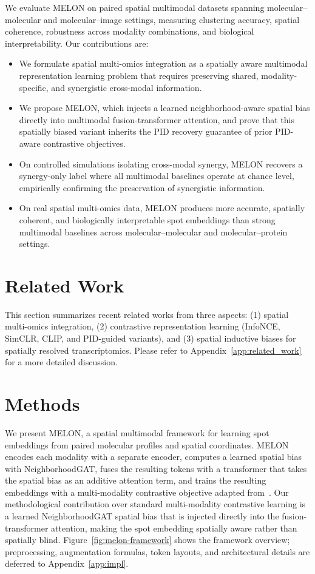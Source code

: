 \documentclass{article}
\theoremstyle{plain}
\theoremstyle{definition}
\begin{document}
We evaluate MELON on paired spatial multimodal datasets spanning molecular--molecular and molecular--image settings, measuring clustering accuracy, spatial coherence, robustness across modality combinations, and biological interpretability. Our contributions are:
\begin{itemize}
  \item We formulate spatial multi-omics integration as a spatially aware multimodal representation learning problem that requires preserving shared, modality-specific, and synergistic cross-modal information.
  \item We propose MELON, which injects a learned neighborhood-aware spatial bias directly into multimodal fusion-transformer attention, and prove that this spatially biased variant inherits the PID recovery guarantee of prior PID-aware contrastive objectives.
  \item On controlled simulations isolating cross-modal synergy, MELON recovers a synergy-only label where all multimodal baselines operate at chance level, empirically confirming the preservation of synergistic information.
  \item On real spatial multi-omics data, MELON produces more accurate, spatially coherent, and biologically interpretable spot embeddings than strong multimodal baselines across molecular--molecular and molecular--protein settings.
\end{itemize}

\section{Related Work}

This section summarizes recent related works from three aspects: (1) spatial multi-omics integration, (2) contrastive representation learning (InfoNCE, SimCLR, CLIP, and PID-guided variants), and (3) spatial inductive biases for spatially resolved transcriptomics. Please refer to Appendix~\ref{app:related_work} for a more detailed discussion.

\section{Methods}
We present MELON, a spatial multimodal framework for learning spot embeddings from paired molecular profiles and spatial coordinates. MELON encodes each modality with a separate encoder, computes a learned spatial bias with NeighborhoodGAT, fuses the resulting tokens with a transformer that takes the spatial bias as an additive attention term, and trains the resulting embeddings with a multi-modality contrastive objective adapted from~\cite{dufumier2024align}. Our methodological contribution over standard multi-modality contrastive learning is a learned NeighborhoodGAT spatial bias that is injected directly into the fusion-transformer attention, making the spot embedding spatially aware rather than spatially blind. Figure~\ref{fig:melon-framework} shows the framework overview; preprocessing, augmentation formulas, token layouts, and architectural details are deferred to Appendix~\ref{app:impl}.
\end{document}
